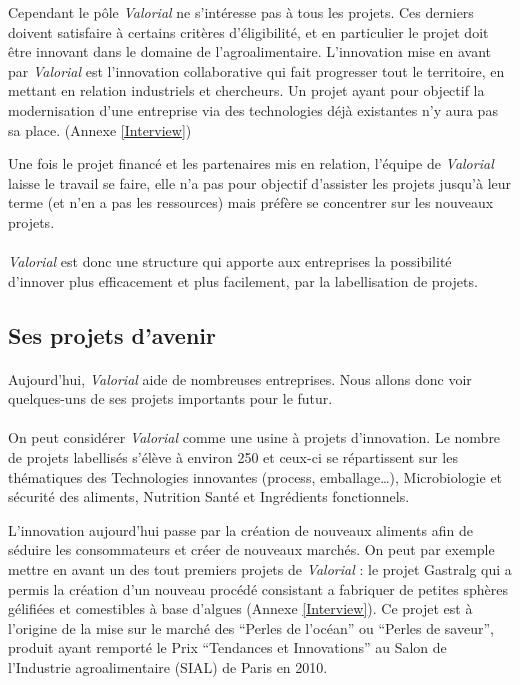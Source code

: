 \documentclass[a4paper,12pt]{report}
\begin{document}
    			Cependant le pôle \textit{Valorial} ne s’intéresse pas à tous les projets. Ces derniers doivent satisfaire à certains critères d'éligibilité, et en particulier le projet doit être innovant dans le domaine de l’agroalimentaire. L’innovation mise en avant par \textit{Valorial} est l'innovation collaborative qui fait progresser tout le territoire, en mettant en relation industriels et chercheurs. Un projet ayant pour objectif la modernisation d’une entreprise via des technologies déjà existantes n’y aura pas sa place. (Annexe \ref{Interview})

    			Une fois le projet financé et les partenaires mis en relation, l’équipe de \textit{Valorial} laisse le travail se faire, elle n’a pas pour objectif d’assister les projets jusqu’à leur terme (et n’en a pas les ressources) mais préfère se concentrer sur les nouveaux projets.
    			
  			\paragraph{}\textit{Valorial} est donc une structure qui apporte aux entreprises la possibilité d'innover plus efficacement et plus facilement, par la labellisation de projets.
				
		\subsection{Ses projets d'avenir}
				\paragraph{}Aujourd'hui, \textit{Valorial} aide de nombreuses entreprises. Nous allons donc voir quelques-uns de ses projets importants pour le futur.
				
				\paragraph{}On peut considérer \textit{Valorial} comme une usine à projets d’innovation. Le nombre de projets labellisés s’élève à environ 250 et ceux-ci se répartissent sur les thématiques des Technologies innovantes (process, emballage…), Microbiologie et sécurité des aliments, Nutrition Santé et Ingrédients fonctionnels\cite{ProjetsAboutis}.

   				L’innovation aujourd’hui passe par la création de nouveaux aliments afin de séduire les consommateurs et créer de nouveaux marchés. On peut par exemple mettre en avant un des tout premiers projets de \textit{Valorial} : le projet Gastralg qui a permis la création d’un nouveau procédé consistant a fabriquer de petites sphères gélifiées et comestibles à base d’algues (Annexe \ref{Interview}). Ce projet est à l’origine de la mise sur le marché des  “Perles de l’océan” ou “Perles de saveur”, produit ayant remporté le Prix “Tendances et Innovations” au Salon de l’Industrie agroalimentaire (SIAL) de Paris en 2010.
    
\end{document}
